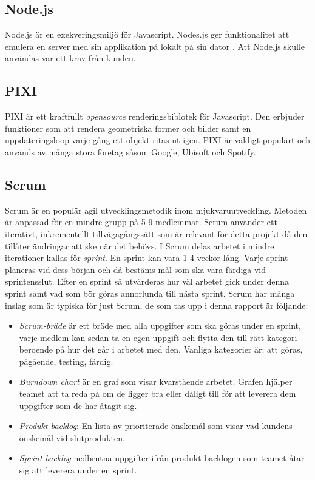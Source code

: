 \subsection*{Node.js}
Node.js är en exekveringsmiljö för Javascript. Nodes.js ger funktionalitet att emulera en server med sin applikation på lokalt på sin dator \cite{Node}. Att Node.js skulle användas var ett krav från kunden.

\subsection*{PIXI}
PIXI är ett kraftfullt \textit{opensource} renderingsbiblotek för Javascript\cite{Pixi}. Den erbjuder funktioner som att rendera geometriska former och bilder samt en uppdateringsloop varje gång ett objekt ritas ut igen. PIXI är väldigt populärt och används av många stora företag såsom Google, Ubisoft och Spotify. 

\subsection*{Scrum}
Scrum är en populär agil utvecklingsmetodik inom mjukvaruutveckling. Metoden är anpassad för en mindre grupp på 5-9 medlemmar. Scrum använder ett iterativt, inkrementellt tillvägagångssätt som är relevant för detta projekt då den tillåter ändringar att ske när det behövs\cite{TheScrum}. I Scrum delas arbetet i mindre iterationer kallas för \textit{sprint}. En sprint kan vara 1-4 veckor lång. Varje sprint planeras vid dess början och då bestäms mål som ska vara färdiga vid sprintensslut. Efter en sprint så utvärderas hur väl arbetet gick under denna sprint samt vad som bör göras annorlunda till nästa sprint. Scrum har många inslag som är typiska för just Scrum, de som tas upp i denna rapport är följande:

\begin{itemize}
	\item \textit{Scrum-bräde} är ett bräde med alla uppgifter som ska göras under en sprint, varje medlem kan sedan ta en egen uppgift och flytta den till rätt kategori beroende på hur det går i arbetet med den. Vanliga kategorier är: att göras, pågående, testing, färdig.
	
	\item \textit{Burndown chart} är en graf som visar kvarstående arbetet. Grafen hjälper teamet att ta reda på om de ligger bra eller dåligt till för att leverera dem uppgifter som de har åtagit sig. 
	
	\item \textit{Produkt-backlog}: En lista av prioriterade önskemål som visar vad kundens önskemål vid slutprodukten.
	
	\item \textit{Sprint-backlog} nedbrutna uppgifter ifrån produkt-backlogen som teamet åtar sig att leverera under en sprint. 	
	
\end{itemize}

